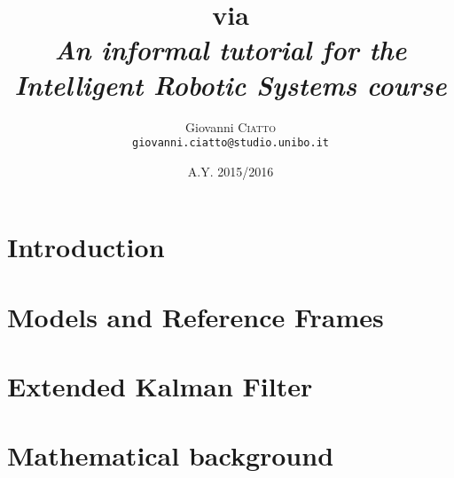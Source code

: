 \documentclass[a4paper,12pt]{article}
\title{
	\textbf{
		\Slam{} via \Ekf{}
	} \\
	{\normalsize\textit{
		An informal tutorial for the \emph{Intelligent Robotic Systems} course
	}}
}
\author{
	Giovanni \textsc{Ciatto} \\ \texttt{giovanni.ciatto@studio.unibo.it} \\
}
\date{A.Y. 2015/2016}
\numberwithin{equation}{section}
\theoremstyle{remark}
\newcommand{\Ekf}{Extended Kalman Filter}
\begin{document}
	
	\maketitle
	
	\section{Introduction}
		
		
	\section{Models and Reference Frames}
		
		
	\section{\Ekf}
		
		
	\newpage
	\appendix
	\section{Mathematical background}
		
	
	\newpage
	{}
	
			
\end{document}
